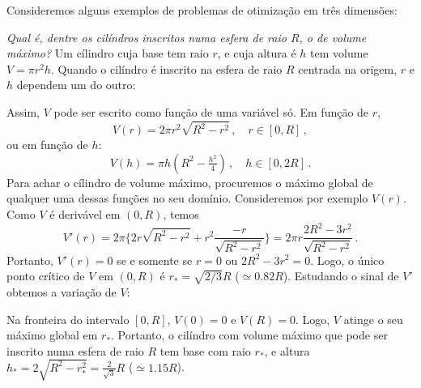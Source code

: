 Consideremos alguns exemplos de problemas de otimização em três dimensões:

\begin{ex}
\emph{Qual é, dentre os cilíndros inscritos numa esfera de raio $R$, o de volume
máximo?}
Um cílindro cuja base tem raio $r$, e cuja altura é $h$ tem volume 
$V=\pi r^2h$. Quando o cilíndro é inscrito na esfera de raio $R$ centrada na
origem, $r$ e $h$ dependem um do outro:
\begin{center}
\begin{bmlimage}\end{bmlimage}
\end{center}
Assim, $V$ pode ser escrito como função de uma variável só.
Em função de $r$,
$$V(r)=2\pi r^2\sqrt{R^2-r^2}\,,\quad r\in [0,R]\,,$$
ou em função de $h$:
$$
V(h)=\pi h(R^2-\tfrac{h^2}{4})\,,\quad h\in [0,2R]\,.
$$
Para achar o cílindro de volume máximo, procuremos o máximo global de qualquer
uma dessas funções no seu domínio. Consideremos por exemplo $V(r)$. Como $V$ é
derivável em $(0,R)$, temos 
$$
V'(r)=2\pi\Big\{
2r\sqrt{R^2-r^2}+r^2\frac{-r}{\sqrt{R^2-r^2}}
\Big\}=2\pi r\frac{2R^2-3r^2}{\sqrt{R^2-r^2}}\,.
$$
Portanto, $V'(r)=0$ se e somente se $r=0$ ou $2R^2-3r^2=0$. Logo, o único ponto
crítico
de $V$ em $(0,R)$ é $r_*=\sqrt{2/3}R$ ($\simeq 0.82 R$). Estudando o sinal de
$V'$ obtemos a variação de $V$:
\begin{center}
\begin{bmlimage}\end{bmlimage}
\end{center}
Na fronteira do intervalo $[0,R]$, $V(0)=0$ e $V(R)=0$. Logo, $V$ atinge o
seu máximo global em $r_*$. Portanto, o cilíndro com volume máximo que pode
ser inscrito numa esfera de raio $R$ tem base com raio $r_*$, e altura
$h_*=2\sqrt{R^2-r_*^2}=\frac{2}{\sqrt{3}}R$ ($\simeq 1.15 R$).
\end{ex}

